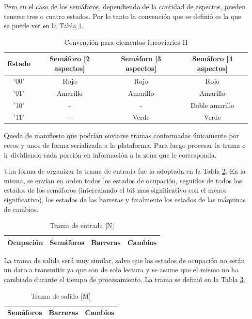 	Pero en el caso de los semáforos, dependiendo de la cantidad de aspectos, pueden tenerse tres o cuatro estados. Por lo tanto la convención que se definió es la que se puede ver en la Tabla \ref{Bool_2}.
	
	\begin{table}[!hbt]
	\renewcommand{\arraystretch}{1.3}
	\caption{Convención para elementos ferroviarios II}
	\label{Bool_2}
	\centering
	\begin{tabular}{ c  c  c  c }
	\hline
	Estado & Semáforo [2 aspectos] & Semáforo [3 aspectos] & Semáforo [4 aspectos] \\	
	\hline
	'00' & Rojo & Rojo & Rojo \\	
	'01' & Amarillo & Amarillo & Amarillo \\	
	'10' & - & - & Doble amarillo \\
	'11' & - & Verde & Verde \\
	\hline
	\end{tabular}
	\end{table}	
	
	Queda de manifiesto que podrían enviarse tramas conformadas únicamente por ceros y unos de forma serializada a la plataforma. Para luego procesar la trama e ir dividiendo cada porción en información a la zona que le corresponda. 
	
	Una forma de organizar la trama de entrada fue la adoptada en la Tabla \ref{Trama_in}. En la misma, se envían en orden todos los estados de ocupación, seguidos de todos los estados de los semáforos (intercalando el bit mas significativo con el menos significativo), los estados de las barreras y finalmente los estados de las máquinas de cambios.
	
	\begin{table}[!hbt]
	\renewcommand{\arraystretch}{1.3}
	\caption{Trama de entrada [N]}
	\label{Trama_in}
	\centering
	\begin{tabular}{ | c | c | c | c | }
	\hline
	Ocupación & Semáforos & Barreras & Cambios \\
	\hline	
	\end{tabular}
	\end{table}		 
	
	La trama de salida será muy similar, salvo que los estados de ocupación no serán un dato a transmitir ya que son de solo lectura y se asume que el mismo no ha cambiado durante el tiempo de procesamiento. La trama se definió en la Tabla \ref{Trama_out}.
	
	\begin{table}[!hbt]
	\renewcommand{\arraystretch}{1.3}
	\caption{Trama de salida [M]}
	\label{Trama_out}
	\centering
	\begin{tabular}{| c | c | c | }
	\hline
	  Semáforos & Barreras & Cambios \\
	\hline	
	\end{tabular}
	\end{table}	
	
